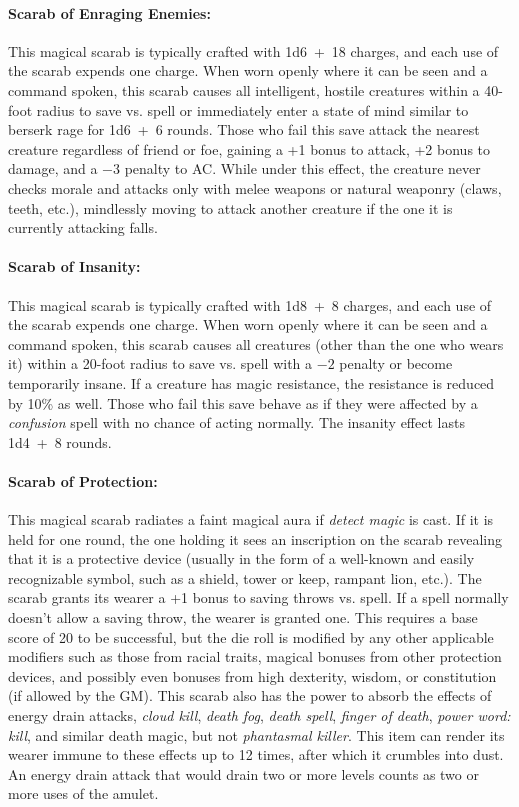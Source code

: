 \begin{multicols}{2}
\paragraph{Scarab of Enraging Enemies:} This magical scarab is typically crafted with 1d6~+~18 charges, and each use of the scarab expends one charge.  When worn openly where it can be seen and a command spoken, this scarab causes all intelligent, hostile creatures within a 40-foot radius to save vs. spell or immediately enter a state of mind similar to berserk rage for 1d6~+~6 rounds.  Those who fail this save attack the nearest creature regardless of friend or foe, gaining a +1 bonus to attack, +2 bonus to damage, and a $-3$ penalty to AC.  While under this effect, the creature never checks morale and attacks only with melee weapons or natural weaponry (claws, teeth, etc.), mindlessly moving to attack another creature if the one it is currently attacking falls.

\paragraph{Scarab of Insanity:} This magical scarab is typically crafted with 1d8~+~8 charges, and each use of the scarab expends one charge.  When worn openly where it can be seen and a command spoken, this scarab causes all creatures (other than the one who wears it) within a 20-foot radius to save vs. spell with a $-2$ penalty or become temporarily insane.  If a creature has magic resistance, the resistance is reduced by 10\% as well.  Those who fail this save behave as if they were affected by a \textit{confusion} spell with no chance of acting normally.  The insanity effect lasts 1d4~+~8 rounds.

\paragraph{Scarab of Protection:} This magical scarab radiates a faint magical aura if \textit{detect magic} is cast.  If it is held for one round, the one holding it sees an inscription on the scarab revealing that it is a protective device (usually in the form of a well-known and easily recognizable symbol, such as a shield, tower or keep, rampant lion, etc.).  The scarab grants its wearer a +1 bonus to saving throws vs. spell.  If a spell normally doesn't allow a saving throw, the wearer is granted one.  This requires a base score of 20 to be successful, but the die roll is modified by any other applicable modifiers such as those from racial traits, magical bonuses from other protection devices, and possibly even bonuses from high dexterity, wisdom, or constitution (if allowed by the GM).  This scarab also has the power to absorb the effects of energy drain attacks, \textit{cloud kill}, \textit{death fog}, \textit{death spell}, \textit{finger of death}, \textit{power word: kill}, and similar death magic, but not \textit{phantasmal killer}.  This item can render its wearer immune to these effects up to 12 times, after which it crumbles into dust.  An energy drain attack that would drain two or more levels counts as two or more uses of the amulet.


\end{multicols}
